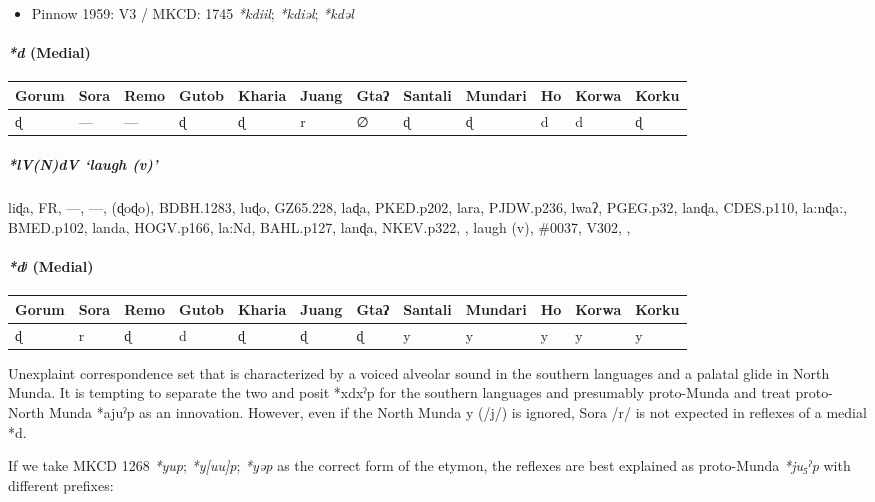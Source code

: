 \documentclass[a4paper,]{article}
\providecommand{\tightlist}{%
  \setlength{\itemsep}{0pt}\setlength{\parskip}{0pt}}
\let\oldparagraph\paragraph
\renewcommand{\paragraph}[1]{\oldparagraph{#1}\mbox{}}
\let\oldsubparagraph\subparagraph
\renewcommand{\subparagraph}[1]{\oldsubparagraph{#1}\mbox{}}
\begin{document}
\begin{itemize}
\tightlist
\item
  Pinnow 1959: V3 / MKCD: 1745 \emph{*kdiil}; \emph{*kdiəl};
  \emph{*kdəl}
\end{itemize}

\paragraph{\texorpdfstring{\emph{*d}
(Medial)}{*d (Medial)}}\label{d-medial}

\begin{longtable}[]{@{}llllllllllll@{}}
\toprule
Gorum & Sora & Remo & Gutob & Kharia & Juang & Gtaʔ & Santali & Mundari
& Ho & Korwa & Korku\tabularnewline
\midrule
\endhead
ɖ & --- & --- & ɖ & ɖ & r & ∅ & ɖ & ɖ & d & d & ɖ\tabularnewline
\bottomrule
\end{longtable}

\subparagraph{\texorpdfstring{\emph{*lV(N)dV} `laugh
(v)'}{*lV(N)dV laugh (v)}}\label{lvndv-laugh-v}

liɖa, FR, ---, ---, (ɖoɖo), BDBH.1283, luɖo, GZ65.228, laɖa, PKED.p202,
lara, PJDW.p236, lwaʔ, PGEG.p32, lanɖa, CDES.p110, la:nɖa:, BMED.p102,
landa, HOGV.p166, la:Nd, BAHL.p127, lanɖa, NKEV.p322, , laugh (v),
\#0037, V302, ,

\paragraph{\texorpdfstring{\emph{*dʲ}
(Medial)}{*dʲ (Medial)}}\label{dux2b2-medial}

\begin{longtable}[]{@{}llllllllllll@{}}
\toprule
Gorum & Sora & Remo & Gutob & Kharia & Juang & Gtaʔ & Santali & Mundari
& Ho & Korwa & Korku\tabularnewline
\midrule
\endhead
ɖ & r & ɖ & d & ɖ & ɖ & ɖ & y & y & y & y & y\tabularnewline
\bottomrule
\end{longtable}

Unexplaint correspondence set that is characterized by a voiced alveolar
sound in the southern languages and a palatal glide in North Munda. It
is tempting to separate the two and posit *xdxˀp for the southern
languages and presumably proto-Munda and treat proto-North Munda *ajuˀp
as an innovation. However, even if the North Munda y (/j/) is ignored,
Sora /r/ is not expected in reflexes of a medial *d.

If we take MKCD 1268 \emph{*yup}; \emph{*y{[}uu{]}p}; \emph{*yəp} as the
correct form of the etymon, the reflexes are best explained as
proto-Munda \emph{*ju₅ˀp} with different prefixes:
\end{document}
